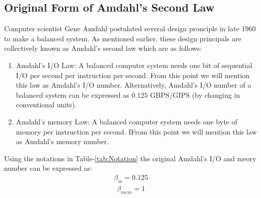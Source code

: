 \documentclass[journal]{IEEEtran}
\begin{document}
\subsection{Original Form of Amdahl's Second Law}
Computer scientist Gene Amdahl postulated several design pronciple in late 1960 to make a balanced system. As mentioned earlier, these design principals are collectively known as Amdahl’s second law  which are as follows:
\begin{enumerate}
\item Amdahl’s I/O Law: A balanced computer system needs one bit of sequential I/O per second per instruction per second. From this point we will mention this law as Amdahl’s I/O number. Alternatively, Amdahl's I/O number of a balanced system can be expressed as $0.125$ GBPS/GIPS (by changing in conventional units).
\item Amdahl’s memory Law: A balanced computer system needs one byte of memory per instruction per second. IFrom this point we will mention this law as Amdahl’s memory number.
\end{enumerate}
Using the notations in Table-\ref{tab:Notation} the original  Amdahl's I/O and meory number can be expressed as:
\begin{equation} \label{eqn:AmdahlIONotation}
\begin{split}
\beta_{io} = 0.125
\end{split}
\end{equation}
\begin{equation} \label{eqn:AmdahlMemNotation}
\begin{split}
\beta_{mem} = 1
\end{split}
\end{equation}
\end{document}
